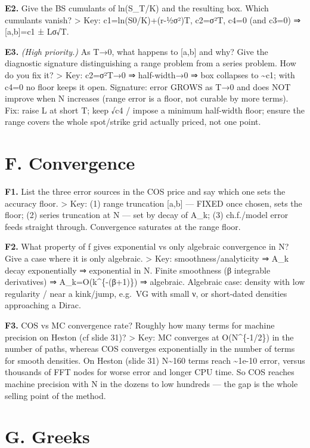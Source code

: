 \documentclass[
  11pt,
]{article}
\begin{document}
\textbf{E2.} Give the BS cumulants of ln(S\_T/K) and the resulting box.
Which cumulants vanish? \textgreater{} Key: c1=ln(S0/K)+(r-½σ²)T,
c2=σ²T, c4=0 (and c3=0) ⇒ {[}a,b{]}=c1 ± Lσ√T.

\textbf{E3.} \emph{(High priority.)} As T→0, what happens to {[}a,b{]}
and why? Give the diagnostic signature distinguishing a range problem
from a series problem. How do you fix it? \textgreater{} Key: c2=σ²T→0 ⇒
half-width→0 ⇒ box collapses to \textasciitilde c1; with c4=0 no floor
keeps it open. Signature: error GROWS as T→0 and does NOT improve when N
increases (range error is a floor, not curable by more terms). Fix:
raise L at short T; keep √c4 / impose a minimum half-width floor; ensure
the range covers the whole spot/strike grid actually priced, not one
point.

\hypertarget{f.-convergence}{%
\section{F. Convergence}\label{f.-convergence}}

\textbf{F1.} List the three error sources in the COS price and say which
one sets the accuracy floor. \textgreater{} Key: (1) range truncation
{[}a,b{]} --- FIXED once chosen, sets the floor; (2) series truncation
at N --- set by decay of A\_k; (3) ch.f./model error feeds straight
through. Convergence saturates at the range floor.

\textbf{F2.} What property of f gives exponential vs only algebraic
convergence in N? Give a case where it is only algebraic. \textgreater{}
Key: smoothness/analyticity ⇒ A\_k decay exponentially ⇒ exponential in
N. Finite smoothness (β integrable derivatives) ⇒
A\_k=O(k\^{}\{-(β+1)\}) ⇒ algebraic. Algebraic case: density with low
regularity / near a kink/jump, e.g.~VG with small ν, or short-dated
densities approaching a Dirac.

\textbf{F3.} COS vs MC convergence rate? Roughly how many terms for
machine precision on Heston (cf slide 31)? \textgreater{} Key: MC
converges at O(N\^{}\{-1/2\}) in the number of paths, whereas COS
converges exponentially in the number of terms for smooth densities. On
Heston (slide 31) N\textasciitilde160 terms reach \textasciitilde1e-10
error, versus thousands of FFT nodes for worse error and longer CPU
time. So COS reaches machine precision with N in the dozens to low
hundreds --- the gap is the whole selling point of the method.

\hypertarget{g.-greeks}{%
\section{G. Greeks}\label{g.-greeks}}
\end{document}
